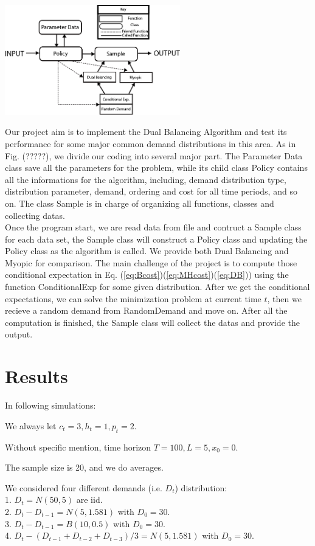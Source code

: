 \documentclass[twoside]{article}
\begin{document}
\begin{multicols}{2}
\begin{center}
  \includegraphics[width=3.0in]{software_diagram.png}
\end{center}
Our project aim is to implement the Dual Balancing Algorithm and test its performance for some major common demand distributions in this area. As in Fig. (?????), we divide our coding into several major part. The Parameter Data class save all the parameters for the problem, while its child class Policy contains all the informations for the algorithm, including, demand distribution type, distribution parameter, demand, ordering and cost for all time periods, and so on. The class Sample is in charge of organizing all functions, classes and collecting datas.\\
Once the program start, we are read data from file and contruct a Sample class for each data set, the Sample class will construct a Policy class and updating the Policy class as the algorithm is called. We provide both Dual Balancing and Myopic for comparison. The main challenge of the project is to compute those conditional expectation in Eq. (\ref{eq:Bcost})(\ref{eq:MHcost})(\ref{eq:DB})) using the function ConditionalExp for some given distribution. After we get the conditional expectations, we can solve the minimization problem at current time $t$, then we recieve a random demand from RandomDemand and move on. After all the computation is finished, the Sample class will collect the datas and provide the output.



\section{Results}

In following simulations:
\begin{compactitem}
      \item We always let $c_t = 3, h_t = 1, p_t = 2$.
      \item Without specific mention, time horizon $T = 100, L = 5, x_0 = 0$.
      \item The sample size is 20, and we do averages.
      \item We considered four different demands (i.e. $D_t$) distribution:\\
            1. $D_t = N(50,5)$ are iid.\\
            2. $D_t-D_{t-1} = N(5,1.581)$ with $D_0=30$.\\
            3. $D_t-D_{t-1} = B(10,0.5)$ with $D_0=30$.\\
            4. $D_t- (D_{t-1} + D_{t-2} + D_{t-3})/3 = N(5,1.581)$ with $D_0=30$.
\end{compactitem}

\end{multicols}
\end{document}
